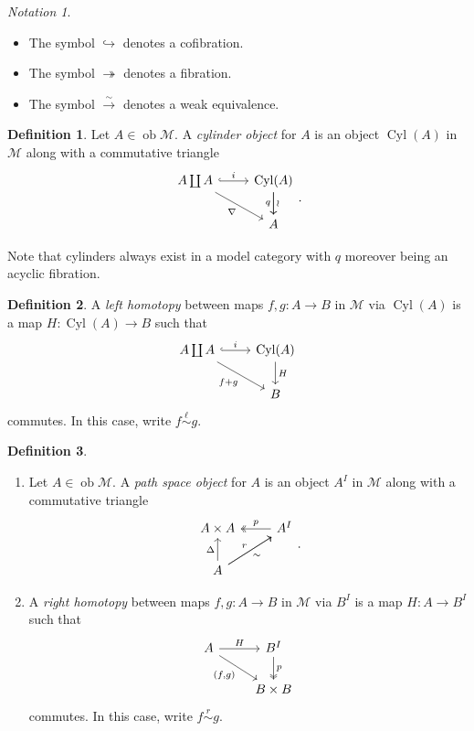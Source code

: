 \documentclass[10pt,letterpaper,cm]{nupset}
\theoremstyle{definition}
\newtheorem{defn}{Definition}[subsection]
\theoremstyle{theorem}
\theoremstyle{remark}
\newtheorem*{notation}{Notation}
\newcommand{\1}{\mathbb{1}}
\newcommand{\m}{\mathcal{M}}
\newcommand{\0}{\vec 0}
\DeclareMathOperator{\ob}{ob}
\DeclareMathOperator{\cyl}{Cyl}
\newcommand{\bi}{\begin{itemize}}
\newcommand{\ei}{\end{itemize}}
\newcommand{\be}{\begin{enumerate}}
\newcommand{\ee}{\end{enumerate}}
\begin{document}
\begin{notation} $ $
\bi
\item The symbol $\hookrightarrow$ denotes a cofibration.
\item The symbol $\twoheadrightarrow$ denotes a fibration.
\item The symbol $\xrightarrow{\sim}$ denotes a weak equivalence. 
\ei
\end{notation}

\begin{defn}
Let $A \in \ob{\m}$. A \textit{cylinder object} for $A$ is an object $\cyl(A)$ in $\m$ along with a commutative triangle
\[
\begin{tikzcd}
	{A  \coprod A} & {\cyl(A)} \\
	& A
	\arrow["q"', from=1-2, to=2-2]
	\arrow["i", hook, from=1-1, to=1-2]
	\arrow["\nabla"', from=1-1, to=2-2]
	\arrow["\wr", from=1-2, to=2-2]
\end{tikzcd}
.\]
\end{defn}

Note that cylinders always exist in a model category with $q$ moreover being an acyclic fibration.

\begin{defn}\label{lhom}
A \textit{left homotopy} between maps $f,g: A \to B$  in $\m$ via $\cyl(A)$ is a map $H : \cyl(A) \to B$ such that
\[
\begin{tikzcd}
	{A\coprod A} & {\cyl(A)} \\
	& B
	\arrow["{f+g}"', from=1-1, to=2-2]
	\arrow["i", hook, from=1-1, to=1-2]
	\arrow["H", from=1-2, to=2-2]
\end{tikzcd}
\] commutes. In this case, write $f \overset{\ell}{\sim}g $.
\end{defn}


\begin{defn} $ $
\be
\item Let $A \in \ob{\m}$. A \textit{path space object} for $A$ is an object $A^I$ in $\m$ along with a commutative triangle
\[
\begin{tikzcd}
	{A\times A} & {A^I} \\
	A
	\arrow["\Delta", from=2-1, to=1-1]
	\arrow["\sim"', from=2-1, to=1-2]
	\arrow["r", from=2-1, to=1-2]
	\arrow["p"', two heads, from=1-2, to=1-1]
\end{tikzcd}
.\]
\item A \textit{right homotopy} between maps $f,g: A \to B$ in $\m$ via $B^I$ is a map $H:A \to B^I$ such that
\[
\begin{tikzcd}
	A & {B^I} \\
	& {B\times B}
	\arrow["{\left(f,g\right)}"', from=1-1, to=2-2]
	\arrow["H", from=1-1, to=1-2]
	\arrow["p", two heads, from=1-2, to=2-2]
\end{tikzcd}
\] commutes. In this case, write $f \overset{r}{\sim} g$.
\ee
\end{defn}
\end{document}
